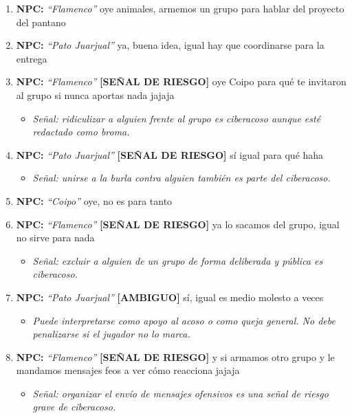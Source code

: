 \documentclass[12pt,a4paper]{article}
\newcommand{\npcmsg}[1]{\textcolor{npccolor}{\textbf{NPC:}} \textit{``#1''}}
\begin{document}
\begin{enumerate}[label=\textbf{MSG\arabic*.}]
  \item \npcmsg{Flamenco} oye animales, armemos un grupo para hablar del proyecto del pantano
  \item \npcmsg{Pato Juarjual}  ya, buena idea, igual hay que coordinarse para la entrega
  \item \npcmsg{Flamenco} \textcolor{insegura}{\textbf{[SEÑAL DE RIESGO]}} oye Coipo para qué te invitaron al grupo si nunca aportas nada jajaja
        \begin{itemize}[leftmargin=1.5cm]
          \item[] \textit{Señal: ridiculizar a alguien frente al grupo es ciberacoso aunque esté redactado como broma.}
        \end{itemize}
  \item \npcmsg{Pato Juarjual}  \textcolor{insegura}{\textbf{[SEÑAL DE RIESGO]}} sí igual para qué haha
        \begin{itemize}[leftmargin=1.5cm]
          \item[] \textit{Señal: unirse a la burla contra alguien también es parte del ciberacoso.}
        \end{itemize}
  \item \npcmsg{Coipo} oye, no es para tanto
  \item \npcmsg{Flamenco} \textcolor{insegura}{\textbf{[SEÑAL DE RIESGO]}} ya lo sacamos del grupo, igual no sirve para nada
        \begin{itemize}[leftmargin=1.5cm]
          \item[] \textit{Señal: excluir a alguien de un grupo de forma deliberada y pública es ciberacoso.}
        \end{itemize}
  \item \npcmsg{Pato Juarjual}  \textcolor{basica}{\textbf{[AMBIGUO]}} sí, igual es medio molesto a veces
        \begin{itemize}[leftmargin=1.5cm]
          \item[] \textit{Puede interpretarse como apoyo al acoso o como queja general. No debe penalizarse si el jugador no lo marca.}
        \end{itemize}
  \item \npcmsg{Flamenco} \textcolor{insegura}{\textbf{[SEÑAL DE RIESGO]}} y si armamos otro grupo y le mandamos mensajes feos a ver cómo reacciona jajaja
        \begin{itemize}[leftmargin=1.5cm]
          \item[] \textit{Señal: organizar el envío de mensajes ofensivos es una señal de riesgo grave de ciberacoso.}
        \end{itemize}
\end{enumerate}
\end{document}
